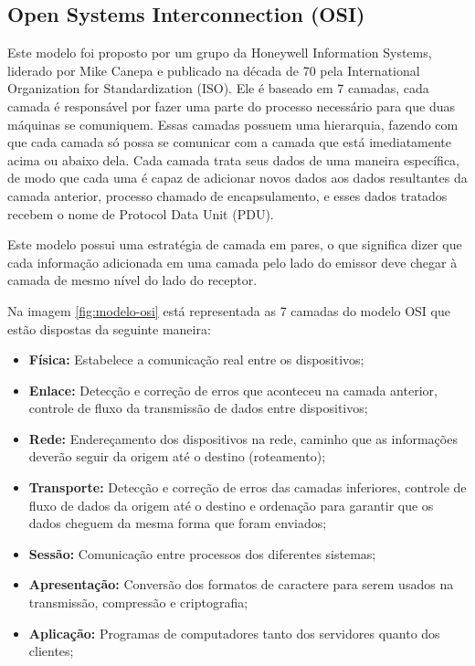         \subsection{Open Systems Interconnection (OSI)}
            Este modelo foi proposto por um grupo da Honeywell Information Systems, liderado por Mike Canepa e publicado na década de 70 pela International Organization for Standardization (ISO). Ele é baseado em 7 camadas, cada camada é responsável por fazer uma parte do processo necessário para que duas máquinas se comuniquem. Essas camadas possuem uma hierarquia, fazendo com que cada camada só possa se comunicar com a camada que está imediatamente acima ou abaixo dela.  Cada camada trata seus dados de uma maneira específica, de modo que cada uma é capaz de adicionar novos dados aos dados resultantes da camada anterior, processo chamado de encapsulamento, e esses dados tratados recebem o nome de Protocol Data Unit (PDU).

		    Este modelo possui uma estratégia de camada em pares, o que significa dizer que cada informação adicionada em uma camada pelo lado do emissor deve chegar à camada de mesmo nível do lado do receptor.

		    Na imagem \ref{fig:modelo-osi} está representada as 7 camadas do modelo OSI que estão dispostas da seguinte maneira:

        \begin{itemize}
            \item \textbf{Física:} Estabelece a comunicação real entre os dispositivos;
            \item \textbf{Enlace:} Detecção e correção de erros que aconteceu na camada anterior, controle de fluxo  da transmissão de dados entre dispositivos;
            \item \textbf{Rede:} Endereçamento dos dispositivos na rede, caminho que as informações deverão seguir da origem até o destino (roteamento);
            \item \textbf{Transporte:} Detecção e correção de erros das camadas inferiores, controle de fluxo de dados da origem até o destino e ordenação para garantir que os dados cheguem da mesma forma que foram enviados;
            \item \textbf{Sessão:} Comunicação entre processos dos diferentes sistemas;
            \item \textbf{Apresentação:} Conversão dos formatos de caractere para serem usados na transmissão, compressão e criptografia;
            \item \textbf{Aplicação:} Programas de computadores tanto dos servidores quanto dos clientes;
        \end{itemize}

